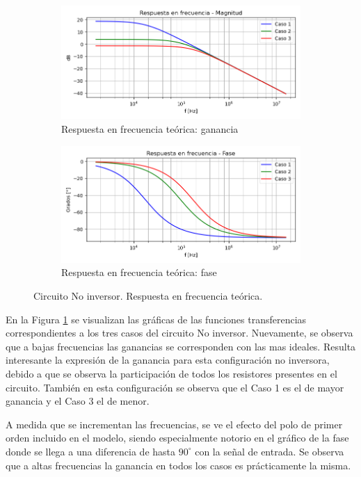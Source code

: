 \begin{figure}[H]
	\centering
	\begin{subfigure}{1\textwidth}
		\centering
		\includegraphics[width=.8\linewidth]{./Imagenes/NoInversorCasosGain.png}  
		\caption{Respuesta en frecuencia teórica: ganancia}
	\end{subfigure}
	\begin{subfigure}{1\textwidth}
		\centering
		\includegraphics[width=.8\linewidth]{./Imagenes/NoInversorCasosPhase.png}  
		\caption{Respuesta en frecuencia teórica: fase}
	\end{subfigure}
	\caption{Circuito No inversor. Respuesta en frecuencia teórica.}
	\label{fig:Noinvcasos}
\end{figure} 

En la Figura \ref{fig:Noinvcasos} se visualizan las gráficas de las funciones transferencias correspondientes a los tres casos del circuito No inversor. Nuevamente, se observa que a bajas frecuencias 
las ganancias se corresponden con las mas ideales. Resulta interesante la expresión de la ganancia para esta configuración no inversora, 
debido a que se observa la participación de todos los resistores presentes en el circuito. También en esta configuración se observa que el Caso 1 es el de mayor ganancia y el Caso 3 el de menor. 

A medida que se incrementan las frecuencias, se ve el efecto del polo de primer orden incluido en el modelo, siendo especialmente notorio en el gráfico de la fase donde se llega
a una diferencia de hasta $90^{\circ}$ con la señal de entrada. Se observa que a altas frecuencias la ganancia en todos los casos es prácticamente la misma.


